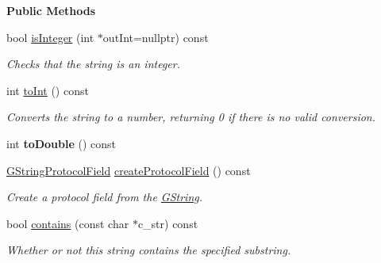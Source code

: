 \begin{Indent}\textbf{ Public Methods}\par
\begin{DoxyCompactItemize}
\item 
\mbox{\label{classrev_1_1_g_string_a09dc6f45e6a4988ebc5bf58b8fab2036}} 
bool \mbox{\hyperlink{classrev_1_1_g_string_a09dc6f45e6a4988ebc5bf58b8fab2036}{is\+Integer}} (int $\ast$out\+Int=nullptr) const
\begin{DoxyCompactList}\small\item\em Checks that the string is an integer. \end{DoxyCompactList}\item 
\mbox{\label{classrev_1_1_g_string_ad119fda2a2da778b881c944eca5f07b7}} 
int \mbox{\hyperlink{classrev_1_1_g_string_ad119fda2a2da778b881c944eca5f07b7}{to\+Int}} () const
\begin{DoxyCompactList}\small\item\em Converts the string to a number, returning 0 if there is no valid conversion. \end{DoxyCompactList}\item 
\mbox{\label{classrev_1_1_g_string_a01f27bcb37e868319269372c37da49a7}} 
int {\bfseries to\+Double} () const
\item 
\mbox{\label{classrev_1_1_g_string_af3bfc9cb6969b836df5c14aaeeb2f49f}} 
\mbox{\hyperlink{structrev_1_1_protocol_field}{G\+String\+Protocol\+Field}} \mbox{\hyperlink{classrev_1_1_g_string_af3bfc9cb6969b836df5c14aaeeb2f49f}{create\+Protocol\+Field}} () const
\begin{DoxyCompactList}\small\item\em Create a protocol field from the \mbox{\hyperlink{classrev_1_1_g_string}{G\+String}}. \end{DoxyCompactList}\item 
\mbox{\label{classrev_1_1_g_string_ac9a7808ebde89ca763306180cfd2ccba}} 
bool \mbox{\hyperlink{classrev_1_1_g_string_ac9a7808ebde89ca763306180cfd2ccba}{contains}} (const char $\ast$c\+\_\+str) const
\begin{DoxyCompactList}\small\item\em Whether or not this string contains the specified substring. \end{DoxyCompactList}\item 

\end{DoxyCompactItemize}
\end{Indent}
